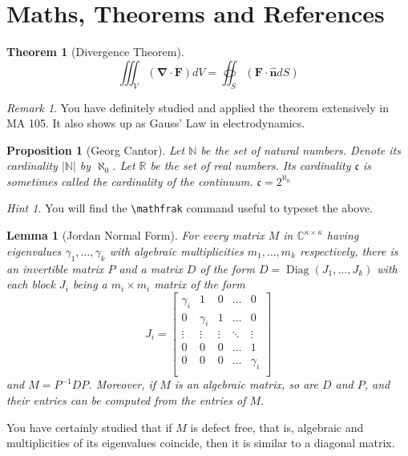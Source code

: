 \documentclass{article}
\newtheorem{theorem}{Theorem}
\newtheorem{lemma}{Lemma}
\newtheorem{proposition}{Proposition}[section]
\theoremstyle{remark}
\newtheorem*{remark}{Remark}
\newtheorem*{hint}{Hint}
\begin{document}
\section{Maths, Theorems and References}
\begin{theorem}[Divergence Theorem]
	\begin{equation*}
		\iiint_V({\boldsymbol\nabla}\cdot\mathbf{F})dV=\oiint_S(\mathbf{F\cdot\hat{n}}dS)
	\end{equation*}
\end{theorem}
\begin{remark}
	You have definitely studied and applied the theorem extensively in MA 105.
	It also shows up as Gauss' Law in electrodynamics.
\end{remark}
\begin{proposition}[Georg Cantor]
	Let $\mathbb{N}$ be the set of natural numbers. Denote its cardinality $|\mathbb{N}|$ by $\aleph_0$.
	Let $\mathbb{R}$ be the set of real numbers.
	Its cardinality $\mathfrak{c}$ is sometimes called the cardinality of the continuum.
	$\mathfrak{c} = 2^{\aleph_0}$
\end{proposition}
\begin{hint}
	You will find the \verb!\mathfrak! command useful to typeset the above.
\end{hint}
\begin{lemma}[Jordan Normal Form]{\label{lem:jnf}}
	For every matrix $M$ in $\mathbb{C}^{\kappa\times\kappa}$ having eigenvalues $\gamma_1,\ldots,\gamma_k$ with algebraic multiplicities $m_1,\ldots,m_k$ respectively, there is an invertible matrix $P$ and a matrix $D$ of the form $D = \operatorname{Diag}(J_1,\ldots,J_k)$ with each block $J_i$ being a $m_i\times m_i$ matrix of the form
	\begin{equation*}
		J_i=
		\begin{bmatrix}
			\gamma_i & 1 & 0 & \ldots & 0\\
			0 & \gamma_i & 1 & \ldots & 0\\
			\vdots & \vdots & \vdots & \ddots & \vdots \\
			0 & 0 & 0 &  \ldots & 1\\
			0 & 0 & 0 &  \ldots & \gamma_i\\
		\end{bmatrix}
	\end{equation*}
	and $M=P^{-1}DP$. Moreover, if $M$ is an algebraic matrix, so are $D$ and $P$, and their entries can be computed from the entries of $M$.
\end{lemma}
You have certainly studied that if $M$ is defect free, that is, algebraic and multiplicities of its eigenvalues coincide, then it is similar to a diagonal matrix.
\end{document}
